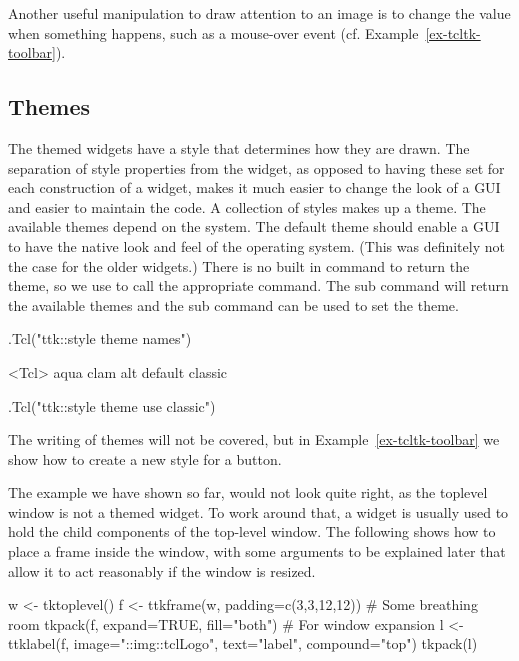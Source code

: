 Another useful manipulation to draw attention to an image is to change
the  value when something happens, such as a mouse-over
event (cf. Example~\ref{ex-tcltk-toolbar}).


\subsection{Themes}
\label{sec:tcltk:overview:themes}


The themed widgets have a style that determines how they are
drawn. The separation of style properties from the widget, as opposed
to having these set for each construction of a widget, makes it much
easier to change the look of a GUI and easier to maintain the code. A
collection of styles makes up a theme. The available themes depend on
the system. The default theme should enable a GUI to have the native
look and feel of the operating system. (This was definitely not the
case for the older \TK\/ widgets.) There is no built in command to
return the theme, so we use  to call the appropriate \TCL\/
command. The  sub command will return the available themes
and the  sub command can be used to set the theme.

\begin{Schunk}
\begin{Sinput}
 .Tcl("ttk::style theme names")
\end{Sinput}
\begin{Soutput}
<Tcl> aqua clam alt default classic 
\end{Soutput}
\begin{Sinput}
 .Tcl("ttk::style theme use classic")
\end{Sinput}
\end{Schunk}

The writing of themes will not be covered, but in
Example~\ref{ex-tcltk-toolbar} we show how to create a new style for a
button.

The example we have shown so far, would not look quite right, as the
toplevel window is not a themed widget. To work around that, a
 widget is usually used to hold the child
components of the top-level window. The following shows how to place a
frame inside the window, with some arguments to be explained later
that allow it to act reasonably if the window is resized.

\begin{Schunk}
\begin{Sinput}
 w <- tktoplevel()
 f <- ttkframe(w, padding=c(3,3,12,12))  # Some breathing room
 tkpack(f, expand=TRUE, fill="both")     # For window expansion
 l <- ttklabel(f, image="::img::tclLogo", text="label", 
               compound="top")
 tkpack(l)
\end{Sinput}
\end{Schunk}

